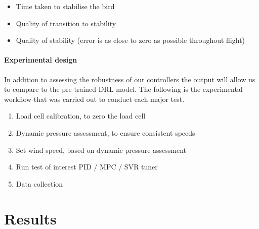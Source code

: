     \begin{itemize}
        \item Time taken to stabilise the bird
        \item Quality of transition to stability
        \item Quality of stability (error is as close to zero as possible throughout flight)
    \end{itemize}

    \paragraph{Experimental design} In addition to assessing the robustness of our controllers the output will
    allow us to compare to the pre-trained DRL model.
    The following is the experimental workflow that was carried out to conduct each major test.

    \begin{enumerate}
        \item Load cell calibration, to zero the load cell
        \item Dynamic pressure assessment, to ensure consistent speeds
        \item Set wind speed, based on dynamic pressure assessment
        \item Run test of interest PID / MPC / SVR tuner
        \item Data collection
    \end{enumerate}

\section{Results}

